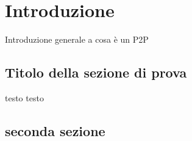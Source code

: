 \chapter{Introduzione}
Introduzione generale a cosa è un P2P
\section{Titolo della sezione di prova}
testo
\pagebreak
testo
\pagebreak
\section{seconda sezione}
\nocite{core_concepts_p2p} 